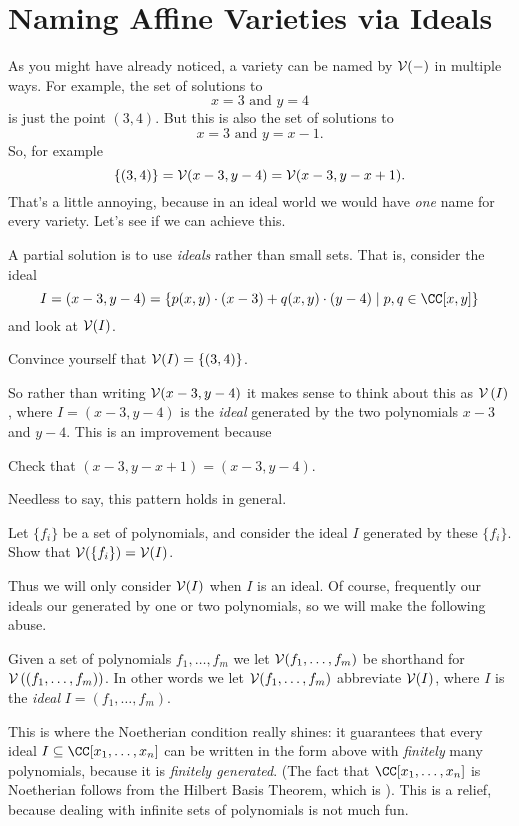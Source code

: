 \section{Naming Affine Varieties via Ideals}
As you might have already noticed, a variety can be named by $\mathcal V(-)$ in multiple ways.
For example, the set of solutions to
\[ x=3 \text{ and } y=4 \]
is just the point $(3,4)$.
But this is also the set of solutions to
\[ x=3 \text{ and } y=x-1. \]
So, for example
\[ \{(3,4)\}
	= \mathcal V(x-3, y-4)
	= \mathcal V(x-3, y-x+1).
	\]
That's a little annoying, because in an ideal world we would have \emph{one} name
for every variety.
Let's see if we can achieve this.

A partial solution is to use \emph{ideals} rather than small sets.
That is, consider the ideal
\[
	I = \left( x-3, y-4 \right)
	= \left\{ p(x,y) \cdot (x-3) + q(x,y) \cdot (y-4)
	\mid p,q \in \CC[x,y] \right\}
\]
and look at $\mathcal V(I)$.
\begin{ques}
	Convince yourself that $\mathcal V(I) = \{(3,4)\}$.
\end{ques}
So rather than writing $\mathcal V(x-3, y-4)$ it makes sense to
think about this as $\mathcal V\left( I \right)$, where $I = (x-3,y-4)$ is the \emph{ideal}
generated by the two polynomials $x-3$ and $y-4$.
This is an improvement because
\begin{ques}
	Check that $(x-3, y-x+1) = (x-3, y-4)$.
\end{ques}

Needless to say, this pattern holds in general.
\begin{ques}
	Let $\{f_i\}$ be a set of polynomials, and consider
	the ideal $I$ generated by these $\{f_i\}$.
	Show that $\mathcal V(\{f_i\}) = \mathcal V(I)$.
\end{ques}

Thus we will only consider $\mathcal V(I)$ when $I$ is an ideal.
Of course, frequently our ideals our generated by one or two polynomials,
so we will make the following abuse.
\begin{abuse}
	Given a set of polynomials $f_1, \dots, f_m$
	we let $\mathcal V(f_1, \dots, f_m)$ be shorthand for
	$\mathcal V\left( \left( f_1, \dots, f_m \right) \right)$.
	In other words we let $\mathcal V(f_1, \dots, f_m)$
	abbreviate $\mathcal V(I)$, where $I$ is the \emph{ideal} $I=(f_1, \dots, f_m)$.
\end{abuse}

This is where the Noetherian condition really shines:
it guarantees that every ideal $I \subseteq \CC[x_1, \dots, x_n]$
can be written in the form above with \emph{finitely} many polynomials,
because it is \emph{finitely generated}.
(The fact that $\CC[x_1, \dots, x_n]$ is Noetherian follows from the Hilbert Basis Theorem,
which is ).
This is a relief, because dealing with infinite sets of polynomials is not much fun.

